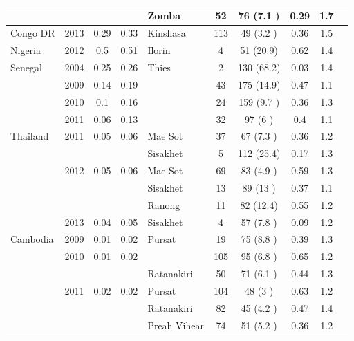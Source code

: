 \documentclass[9pt,lineno]{elife}
\begin{document}
\begin{table}[btp]
{\begin{tabular}{p{1.5cm} c c c |p{1.5cm} c c c c c}
                &               &               &               &Zomba&52   &76   (7.1 )&0.29 &1.7  &\\
\hline
Congo DR        &2013           &0.29  &0.33  &Kinshasa&113  &49   (3.2 )&0.36 &1.5  &\\
\hline
Nigeria         &2012           &0.5   &0.51  &Ilorin&4    &51   (20.9)&0.62 &1.4  &\\
\hline
Senegal         &2004           &0.25  &0.26  &Thies&2    &130  (68.2)&0.03 &1.4  &\\
                &2009           &0.14  &0.19  &               &43   &175  (14.9)&0.47 &1.1  &\\
                &2010           &0.1   &0.16  &               &24   &159  (9.7 )&0.36 &1.3  &\\
                &2011           &0.06  &0.13  &               &32   &97   (6   )&0.4  &1.1  &\\
\hline
\hline
Thailand        &2011           &0.05  &0.06  &Mae Sot&37   &67   (7.3 )&0.36 &1.2  &\\
                &               &               &               &Sisakhet&5    &112  (25.4)&0.17 &1.3  &\\
                &2012           &0.05  &0.06  &Mae Sot&69   &83   (4.9 )&0.59 &1.3  &\\
                &               &               &               &Sisakhet&13   &89   (13  )&0.37 &1.1  &\\
                &               &               &               &Ranong&11   &82   (12.4)&0.55 &1.2  &\\
                &2013           &0.04  &0.05  &Sisakhet&4    &57   (7.8 )&0.09 &1.2  &\\
\hline
Cambodia        &2009           &0.01  &0.02  &Pursat&19   &75   (8.8 )&0.39 &1.3  &\\
                &2010           &0.01  &0.02  &               &105  &95   (6.8 )&0.65 &1.2  &\\
                &               &               &               &Ratanakiri&50   &71   (6.1 )&0.44 &1.3  &\\
                &2011           &0.02  &0.02  &Pursat&104  &48   (3   )&0.63 &1.2  &\\
                &               &               &               &Ratanakiri&82   &45   (4.2 )&0.47 &1.4  &\\
                &               &               &               &Preah Vihear&74   &51   (5.2 )&0.36 &1.2  &\\

\end{tabular}}
\end{table}
\end{document}
